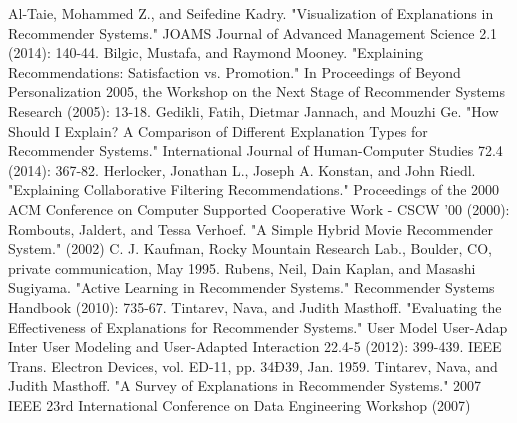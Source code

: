\documentclass[letterpaper, 10 pt, conference]{ieeeconf}  %
\begin{document}
\addtolength{\textheight}{-12cm}   %










\begin{thebibliography}{99}

 Al-Taie, Mohammed Z., and Seifedine Kadry. "Visualization of Explanations in Recommender Systems." JOAMS Journal of Advanced Management Science 2.1 (2014): 140-44.
 Bilgic, Mustafa, and Raymond Mooney. "Explaining Recommendations: Satisfaction vs. Promotion." In Proceedings of Beyond Personalization 2005, the Workshop on the Next Stage of Recommender Systems Research (2005): 13-18.
 Gedikli, Fatih, Dietmar Jannach, and Mouzhi Ge. "How Should I Explain? A Comparison of Different Explanation Types for Recommender Systems." International Journal of Human-Computer Studies 72.4 (2014): 367-82.
 Herlocker, Jonathan L., Joseph A. Konstan, and John Riedl. "Explaining Collaborative Filtering Recommendations." Proceedings of the 2000 ACM Conference on Computer Supported Cooperative Work - CSCW '00 (2000):
 Rombouts, Jaldert, and Tessa Verhoef. "A Simple Hybrid Movie Recommender System." (2002)
 C. J. Kaufman, Rocky Mountain Research Lab., Boulder, CO, private communication, May 1995.
 Rubens, Neil, Dain Kaplan, and Masashi Sugiyama. "Active Learning in Recommender Systems." Recommender Systems Handbook (2010): 735-67.
 Tintarev, Nava, and Judith Masthoff. "Evaluating the Effectiveness of Explanations for Recommender Systems." User Model User-Adap Inter User Modeling and User-Adapted Interaction 22.4-5 (2012): 399-439. IEEE Trans. Electron Devices, vol. ED-11, pp. 34Ð39, Jan. 1959.
 Tintarev, Nava, and Judith Masthoff. "A Survey of Explanations in Recommender Systems." 2007 IEEE 23rd International Conference on Data Engineering Workshop (2007)



\end{thebibliography}
\end{document}
